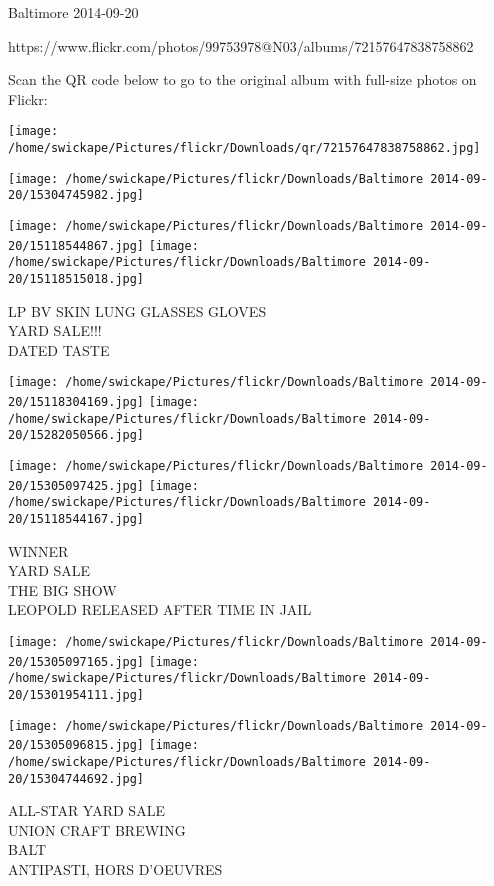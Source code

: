 \documentclass[10pt,letterpaper]{article}
\begin{document}
Baltimore 2014-09-20

https://www.flickr.com/photos/99753978@N03/albums/72157647838758862

Scan the QR code below to go to the original album with full-size photos on Flickr:

\texttt{[image: /home/swickape/Pictures/flickr/Downloads/qr/72157647838758862.jpg]}
\pagebreak

\texttt{[image: /home/swickape/Pictures/flickr/Downloads/Baltimore 2014-09-20/15304745982.jpg]}

\vspace{0.25in}
\texttt{[image: /home/swickape/Pictures/flickr/Downloads/Baltimore 2014-09-20/15118544867.jpg]}
\texttt{[image: /home/swickape/Pictures/flickr/Downloads/Baltimore 2014-09-20/15118515018.jpg]}

LP BV SKIN LUNG GLASSES GLOVES\\
YARD SALE!!!\\
DATED TASTE\\
\pagebreak

\texttt{[image: /home/swickape/Pictures/flickr/Downloads/Baltimore 2014-09-20/15118304169.jpg]}
\texttt{[image: /home/swickape/Pictures/flickr/Downloads/Baltimore 2014-09-20/15282050566.jpg]}

\texttt{[image: /home/swickape/Pictures/flickr/Downloads/Baltimore 2014-09-20/15305097425.jpg]}
\texttt{[image: /home/swickape/Pictures/flickr/Downloads/Baltimore 2014-09-20/15118544167.jpg]}

WINNER\\
YARD SALE\\
THE BIG SHOW\\
LEOPOLD RELEASED AFTER TIME IN JAIL\\
\pagebreak

\texttt{[image: /home/swickape/Pictures/flickr/Downloads/Baltimore 2014-09-20/15305097165.jpg]}
\texttt{[image: /home/swickape/Pictures/flickr/Downloads/Baltimore 2014-09-20/15301954111.jpg]}

\texttt{[image: /home/swickape/Pictures/flickr/Downloads/Baltimore 2014-09-20/15305096815.jpg]}
\texttt{[image: /home/swickape/Pictures/flickr/Downloads/Baltimore 2014-09-20/15304744692.jpg]}

ALL{-}STAR YARD SALE\\
UNION CRAFT BREWING\\
BALT\\
ANTIPASTI, HORS D'OEUVRES\\
\pagebreak
\end{document}
